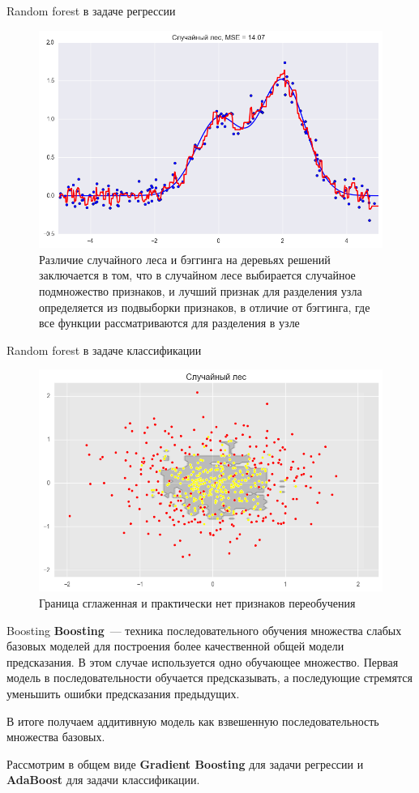 \documentclass[notheorems, handout]{beamer}
\begin{document}
\begin{frame}{Random forest в задаче регрессии}
\begin{figure}[h!]
  \includegraphics[width=0.8 \textwidth]{img/rf_re}
 \caption{Различие случайного леса и бэггинга на деревьях решений заключается в том, что в случайном лесе выбирается случайное подмножество признаков, и лучший признак для разделения узла определяется из подвыборки признаков, в отличие от бэггинга, где все функции рассматриваются для разделения в узле}
\end{figure}
\end{frame}

\begin{frame}{Random forest в задаче классификации}
\begin{figure}[h!]
  \includegraphics[width=1 \textwidth]{img/rf_cl}
 \caption{Граница сглаженная и практически нет признаков переобучения}
\end{figure}
\end{frame}

\begin{frame}{Boosting}
\textbf{Boosting}~--- техника последовательного обучения множества слабых базовых моделей для построения более качественной общей модели предсказания. В этом случае используется одно обучающее множество. Первая модель в последовательности обучается предсказывать, а последующие стремятся уменьшить ошибки предсказания предыдущих. 
\par\smallskip
В итоге получаем аддитивную модель как взвешенную последовательность множества базовых.
\par\smallskip
Рассмотрим в общем виде \textbf{Gradient Boosting} для задачи регрессии и \textbf{AdaBoost} для задачи классификации.
\end{frame}
\end{document}
